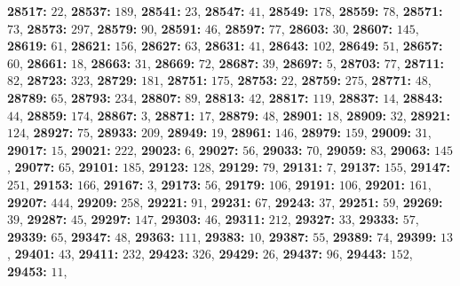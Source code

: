 \textsf{\bfseries 28517:} $22$, \textsf{\bfseries 28537:} $189$, \textsf{\bfseries 28541:} $23$, \textsf{\bfseries 28547:} $41$, \textsf{\bfseries 28549:} $178$, \textsf{\bfseries 28559:} $78$, \textsf{\bfseries 28571:} $73$, \textsf{\bfseries 28573:} $297$, \textsf{\bfseries 28579:} $90$, \textsf{\bfseries 28591:} $46$, \textsf{\bfseries 28597:} $77$, \textsf{\bfseries 28603:} $30$, \textsf{\bfseries 28607:} $145$, \textsf{\bfseries 28619:} $61$, \textsf{\bfseries 28621:} $156$, \textsf{\bfseries 28627:} $63$, \textsf{\bfseries 28631:} $41$, \textsf{\bfseries 28643:} $102$, \textsf{\bfseries 28649:} $51$, \textsf{\bfseries 28657:} $60$, \textsf{\bfseries 28661:} $18$, \textsf{\bfseries 28663:} $31$, \textsf{\bfseries 28669:} $72$, \textsf{\bfseries 28687:} $39$, \textsf{\bfseries 28697:} $5$, \textsf{\bfseries 28703:} $77$, \textsf{\bfseries 28711:} $82$, \textsf{\bfseries 28723:} $323$, \textsf{\bfseries 28729:} $181$, \textsf{\bfseries 28751:} $175$, \textsf{\bfseries 28753:} $22$, \textsf{\bfseries 28759:} $275$, \textsf{\bfseries 28771:} $48$, \textsf{\bfseries 28789:} $65$, \textsf{\bfseries 28793:} $234$, \textsf{\bfseries 28807:} $89$, \textsf{\bfseries 28813:} $42$, \textsf{\bfseries 28817:} $119$, \textsf{\bfseries 28837:} $14$, \textsf{\bfseries 28843:} $44$, \textsf{\bfseries 28859:} $174$, \textsf{\bfseries 28867:} $3$, \textsf{\bfseries 28871:} $17$, \textsf{\bfseries 28879:} $48$, \textsf{\bfseries 28901:} $18$, \textsf{\bfseries 28909:} $32$, \textsf{\bfseries 28921:} $124$, \textsf{\bfseries 28927:} $75$, \textsf{\bfseries 28933:} $209$, \textsf{\bfseries 28949:} $19$, \textsf{\bfseries 28961:} $146$, \textsf{\bfseries 28979:} $159$, \textsf{\bfseries 29009:} $31$, \textsf{\bfseries 29017:} $15$, \textsf{\bfseries 29021:} $222$, \textsf{\bfseries 29023:} $6$, \textsf{\bfseries 29027:} $56$, \textsf{\bfseries 29033:} $70$, \textsf{\bfseries 29059:} $83$, \textsf{\bfseries 29063:} $145$, \textsf{\bfseries 29077:} $65$, \textsf{\bfseries 29101:} $185$, \textsf{\bfseries 29123:} $128$, \textsf{\bfseries 29129:} $79$, \textsf{\bfseries 29131:} $7$, \textsf{\bfseries 29137:} $155$, \textsf{\bfseries 29147:} $251$, \textsf{\bfseries 29153:} $166$, \textsf{\bfseries 29167:} $3$, \textsf{\bfseries 29173:} $56$, \textsf{\bfseries 29179:} $106$, \textsf{\bfseries 29191:} $106$, \textsf{\bfseries 29201:} $161$, \textsf{\bfseries 29207:} $444$, \textsf{\bfseries 29209:} $258$, \textsf{\bfseries 29221:} $91$, \textsf{\bfseries 29231:} $67$, \textsf{\bfseries 29243:} $37$, \textsf{\bfseries 29251:} $59$, \textsf{\bfseries 29269:} $39$, \textsf{\bfseries 29287:} $45$, \textsf{\bfseries 29297:} $147$, \textsf{\bfseries 29303:} $46$, \textsf{\bfseries 29311:} $212$, \textsf{\bfseries 29327:} $33$, \textsf{\bfseries 29333:} $57$, \textsf{\bfseries 29339:} $65$, \textsf{\bfseries 29347:} $48$, \textsf{\bfseries 29363:} $111$, \textsf{\bfseries 29383:} $10$, \textsf{\bfseries 29387:} $55$, \textsf{\bfseries 29389:} $74$, \textsf{\bfseries 29399:} $13$, \textsf{\bfseries 29401:} $43$, \textsf{\bfseries 29411:} $232$, \textsf{\bfseries 29423:} $326$, \textsf{\bfseries 29429:} $26$, \textsf{\bfseries 29437:} $96$, \textsf{\bfseries 29443:} $152$, \textsf{\bfseries 29453:} $11$, 
